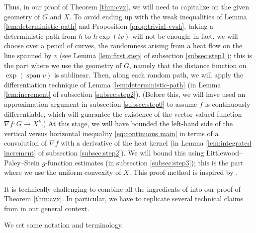 \documentclass[11pt,reqno]{amsart}
\newcommand{\1}{\mathbf 1}
\begin{document}
Thus, in our proof of Theorem \ref{thm:cvx}, we will need to capitalize on the given geometry of $G$ and $X$. To avoid ending up with the weak inequalities of Lemma \ref{lem:deterministic-path} and Proposition \ref{prop:trivial-vvsh}, taking a deterministic path from $h$ to $h\exp\left(tv\right)$ will not be enough; in fact, we will choose over a pencil of curves, the randomness arising from a heat flow on the line spanned by $v$ (see Lemma \ref{lem:first step} of subsection \ref{subsec:step1}); this is the part where we use the geometry of $G$, namely that the distance function on $\exp\left(\operatorname{span}v\right)$ is sublinear. Then, along each random path, we will apply the differentiation technique of Lemma \ref{lem:deterministic-path} (in Lemma \ref{lem:increment} of subsection \ref{subsec:step2}). (Before this, we will have used an approximation argument in subsection \ref{subsec:step0} to assume $f$ is continuously differentiable, which will guarantee the existence of the vector-valued function $\nabla f:G\to X^k$.) At this stage, we will have bounded the left-hand side of the vertical versus horizontal inequality \eqref{eq:continuous main} in terms of a convolution of $\nabla f$ with a derivative of the heat kernel (in Lemma \ref{lem:integrated increment} of subsection \ref{subsec:step2}). We will bound this using Littlewood--Paley--Stein $g$-function estimates (in subsection \ref{subsec:step3}); this is the part where we use the uniform convexity of $X$. This proof method is inspired by \cite{lafforgue2014vertical,hytonen2019heat}.

It is technically challenging to combine all the ingredients of \cite{lafforgue2014vertical,hytonen2019heat} into our proof of Theorem \ref{thm:cvx}. In particular, we have to replicate several technical claims from \cite{lafforgue2014vertical,hytonen2019heat} in our general context.


We set some notation and terminology.
\end{document}
